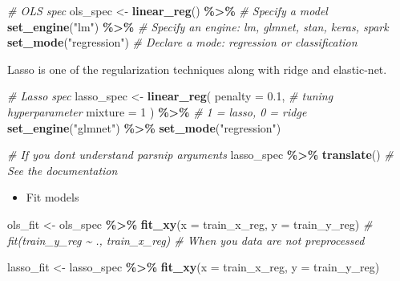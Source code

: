 \documentclass[
]{book}
\newenvironment{Shaded}{\begin{snugshade}}{\end{snugshade}}
\newcommand{\AttributeTok}[1]{\textcolor[rgb]{0.13,0.29,0.53}{#1}}
\newcommand{\CommentTok}[1]{\textcolor[rgb]{0.56,0.35,0.01}{\textit{#1}}}
\newcommand{\DecValTok}[1]{\textcolor[rgb]{0.00,0.00,0.81}{#1}}
\newcommand{\FloatTok}[1]{\textcolor[rgb]{0.00,0.00,0.81}{#1}}
\newcommand{\FunctionTok}[1]{\textcolor[rgb]{0.13,0.29,0.53}{\textbf{#1}}}
\newcommand{\NormalTok}[1]{#1}
\newcommand{\OtherTok}[1]{\textcolor[rgb]{0.56,0.35,0.01}{#1}}
\newcommand{\SpecialCharTok}[1]{\textcolor[rgb]{0.81,0.36,0.00}{\textbf{#1}}}
\newcommand{\StringTok}[1]{\textcolor[rgb]{0.31,0.60,0.02}{#1}}
\providecommand{\tightlist}{%
  \setlength{\itemsep}{0pt}\setlength{\parskip}{0pt}}
\begin{document}
\begin{Shaded}
\begin{Highlighting}[]
\CommentTok{\# OLS spec}
\NormalTok{ols\_spec }\OtherTok{\textless{}{-}} \FunctionTok{linear\_reg}\NormalTok{() }\SpecialCharTok{\%\textgreater{}\%} \CommentTok{\# Specify a model}
  \FunctionTok{set\_engine}\NormalTok{(}\StringTok{"lm"}\NormalTok{) }\SpecialCharTok{\%\textgreater{}\%} \CommentTok{\# Specify an engine: lm, glmnet, stan, keras, spark}
  \FunctionTok{set\_mode}\NormalTok{(}\StringTok{"regression"}\NormalTok{) }\CommentTok{\# Declare a mode: regression or classification}
\end{Highlighting}
\end{Shaded}

Lasso is one of the regularization techniques along with ridge and elastic-net.

\begin{Shaded}
\begin{Highlighting}[]
\CommentTok{\# Lasso spec}
\NormalTok{lasso\_spec }\OtherTok{\textless{}{-}} \FunctionTok{linear\_reg}\NormalTok{(}
  \AttributeTok{penalty =} \FloatTok{0.1}\NormalTok{, }\CommentTok{\# tuning hyperparameter}
  \AttributeTok{mixture =} \DecValTok{1}
\NormalTok{) }\SpecialCharTok{\%\textgreater{}\%} \CommentTok{\# 1 = lasso, 0 = ridge}
  \FunctionTok{set\_engine}\NormalTok{(}\StringTok{"glmnet"}\NormalTok{) }\SpecialCharTok{\%\textgreater{}\%}
  \FunctionTok{set\_mode}\NormalTok{(}\StringTok{"regression"}\NormalTok{)}
\end{Highlighting}
\end{Shaded}

\begin{Shaded}
\begin{Highlighting}[]
\CommentTok{\# If you don\textquotesingle{}t understand parsnip arguments}
\NormalTok{lasso\_spec }\SpecialCharTok{\%\textgreater{}\%} \FunctionTok{translate}\NormalTok{() }\CommentTok{\# See the documentation}
\end{Highlighting}
\end{Shaded}

\begin{itemize}
\tightlist
\item
  Fit models
\end{itemize}

\begin{Shaded}
\begin{Highlighting}[]
\NormalTok{ols\_fit }\OtherTok{\textless{}{-}}\NormalTok{ ols\_spec }\SpecialCharTok{\%\textgreater{}\%}
  \FunctionTok{fit\_xy}\NormalTok{(}\AttributeTok{x =}\NormalTok{ train\_x\_reg, }\AttributeTok{y =}\NormalTok{ train\_y\_reg)}
\CommentTok{\# fit(train\_y\_reg \textasciitilde{} ., train\_x\_reg) \# When you data are not preprocessed}

\NormalTok{lasso\_fit }\OtherTok{\textless{}{-}}\NormalTok{ lasso\_spec }\SpecialCharTok{\%\textgreater{}\%}
  \FunctionTok{fit\_xy}\NormalTok{(}\AttributeTok{x =}\NormalTok{ train\_x\_reg, }\AttributeTok{y =}\NormalTok{ train\_y\_reg)}
\end{Highlighting}
\end{Shaded}
\end{document}
